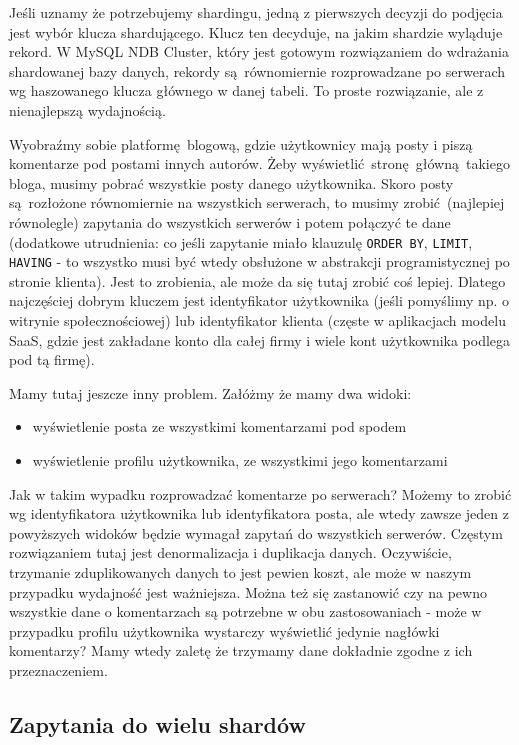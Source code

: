 \documentclass[a4paper,12pt]{article}
\begin{document}
Jeśli uznamy że potrzebujemy shardingu, jedną z pierwszych decyzji do podjęcia jest wybór klucza shardującego. Klucz ten decyduje, na jakim shardzie wyląduje rekord. W MySQL NDB Cluster, który jest gotowym rozwiązaniem do wdrażania shardowanej bazy danych, rekordy są równomiernie rozprowadzane po serwerach wg haszowanego klucza głównego w danej tabeli. To proste rozwiązanie, ale z nienajlepszą wydajnością.

Wyobraźmy sobie platformę blogową, gdzie użytkownicy mają posty i piszą komentarze pod postami innych autorów. Żeby wyświetlić stronę główną takiego bloga, musimy pobrać wszystkie posty danego użytkownika. Skoro posty są rozłożone równomiernie na wszystkich serwerach, to musimy zrobić (najlepiej równolegle) zapytania do wszystkich serwerów i potem połączyć te dane (dodatkowe utrudnienia: co jeśli zapytanie miało klauzulę \texttt{ORDER BY}, \texttt{LIMIT}, \texttt{HAVING} - to wszystko musi być wtedy obsłużone w abstrakcji programistycznej po stronie klienta). Jest to zrobienia, ale może da się tutaj zrobić coś lepiej. Dlatego najczęściej dobrym kluczem jest identyfikator użytkownika (jeśli pomyślimy np. o witrynie społecznościowej) lub identyfikator klienta (częste w aplikacjach modelu SaaS, gdzie jest zakładane konto dla całej firmy i wiele kont użytkownika podlega pod tą firmę).

Mamy tutaj jeszcze inny problem. Załóżmy że mamy dwa widoki:
\begin{itemize}
 \item wyświetlenie posta ze wszystkimi komentarzami pod spodem
 \item wyświetlenie profilu użytkownika, ze wszystkimi jego komentarzami
\end{itemize}
Jak w takim wypadku rozprowadzać komentarze po serwerach? Możemy to zrobić wg identyfikatora użytkownika lub identyfikatora posta, ale wtedy zawsze jeden z powyższych widoków będzie wymagał zapytań do wszystkich serwerów. Częstym rozwiązaniem tutaj jest denormalizacja i duplikacja danych. Oczywiście, trzymanie zduplikowanych danych to jest pewien koszt, ale może w naszym przypadku wydajność jest ważniejsza. Można też się zastanowić czy na pewno wszystkie dane o komentarzach są potrzebne w obu zastosowaniach - może w przypadku profilu użytkownika wystarczy wyświetlić jedynie nagłówki komentarzy? Mamy wtedy zaletę że trzymamy dane dokładnie zgodne z ich przeznaczeniem.

\subsection{Zapytania do wielu shardów}
\end{document}
